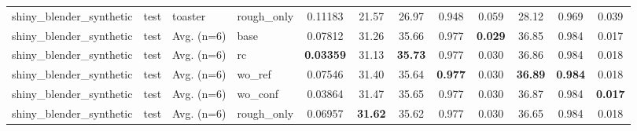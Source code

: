 \begin{table}[t]
{\begin{tabular}{llllcccccccc}
shiny\_blender\_synthetic & test & toaster & rough\_only & 0.11183 & 21.57 & 26.97 & 0.948 & 0.059 & 28.12 & 0.969 & 0.039 \\
shiny\_blender\_synthetic & test & Avg. (n=6) & base & 0.07812 & 31.26 & 35.66 & 0.977 & \textbf{0.029} & 36.85 & 0.984 & 0.017 \\
shiny\_blender\_synthetic & test & Avg. (n=6) & rc & \textbf{0.03359} & 31.13 & \textbf{35.73} & 0.977 & 0.030 & 36.86 & 0.984 & 0.018 \\
shiny\_blender\_synthetic & test & Avg. (n=6) & wo\_ref & 0.07546 & 31.40 & 35.64 & \textbf{0.977} & 0.030 & \textbf{36.89} & \textbf{0.984} & 0.018 \\
shiny\_blender\_synthetic & test & Avg. (n=6) & wo\_conf & 0.03864 & 31.47 & 35.65 & 0.977 & 0.030 & 36.87 & 0.984 & \textbf{0.017} \\
shiny\_blender\_synthetic & test & Avg. (n=6) & rough\_only & 0.06957 & \textbf{31.62} & 35.62 & 0.977 & 0.030 & 36.65 & 0.984 & 0.018 \\
\bottomrule
\end{tabular}}
\end{table}
